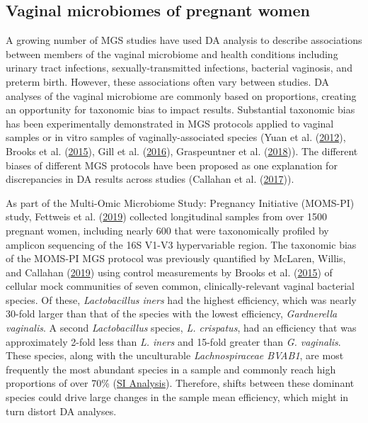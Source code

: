 \documentclass[
]{article}
\begin{document}
\hypertarget{vaginal-microbiomes-of-pregnant-women}{%
\subsection{Vaginal microbiomes of pregnant women}\label{vaginal-microbiomes-of-pregnant-women}}

A growing number of MGS studies have used DA analysis to describe associations between members of the vaginal microbiome and health conditions including urinary tract infections, sexually-transmitted infections, bacterial vaginosis, and preterm birth.
However, these associations often vary between studies.
DA analyses of the vaginal microbiome are commonly based on proportions, creating an opportunity for taxonomic bias to impact results.
Substantial taxonomic bias has been experimentally demonstrated in MGS protocols applied to vaginal samples or in vitro samples of vaginally-associated species (Yuan et al. (\protect\hyperlink{ref-yuan2012eval}{2012}), Brooks et al. (\protect\hyperlink{ref-brooks2015thet}{2015}), Gill et al. (\protect\hyperlink{ref-gill2016eval}{2016}), Graspeuntner et al. (\protect\hyperlink{ref-graspeuntner2018sele}{2018})).
The different biases of different MGS protocols have been proposed as one explanation for discrepancies in DA results across studies (Callahan et al. (\protect\hyperlink{ref-callahan2017repl}{2017})).

As part of the Multi-Omic Microbiome Study: Pregnancy Initiative (MOMS-PI) study, Fettweis et al. (\protect\hyperlink{ref-fettweis2019thev}{2019}) collected longitudinal samples from over 1500 pregnant women, including nearly 600 that were taxonomically profiled by amplicon sequencing of the 16S V1-V3 hypervariable region.
The taxonomic bias of the MOMS-PI MGS protocol was previously quantified by McLaren, Willis, and Callahan (\protect\hyperlink{ref-mclaren2019cons}{2019}) using control measurements by Brooks et al. (\protect\hyperlink{ref-brooks2015thet}{2015}) of cellular mock communities of seven common, clinically-relevant vaginal bacterial species.
Of these, \emph{Lactobacillus iners} had the highest efficiency, which was nearly 30-fold larger than that of the species with the lowest efficiency, \emph{Gardnerella vaginalis}.
A second \emph{Lactobacillus} species, \emph{L. crispatus}, had an efficiency that was approximately 2-fold less than \emph{L. iners} and 15-fold greater than \emph{G. vaginalis}.
These species, along with the unculturable \emph{Lachnospiraceae BVAB1}, are most frequently the most abundant species in a sample and commonly reach high proportions of over 70\%
(\href{https://mikemc.github.io/differential-abundance-theory/notebook/posts/2021-11-01-momspi-summary/}{SI Analysis}).
Therefore, shifts between these dominant species could drive large changes in the sample mean efficiency, which might in turn distort DA analyses.
\end{document}
